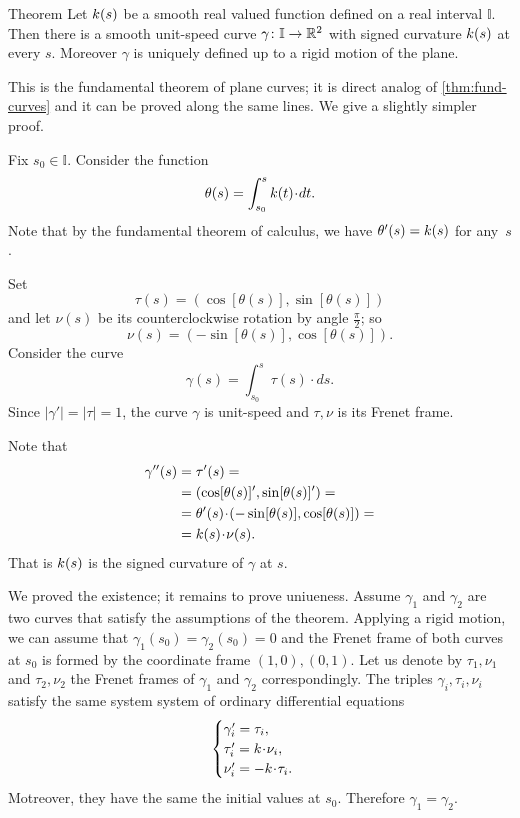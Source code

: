 \begin{thm}{Theorem}\label{thm:fund-curves-2D}
Let $k(s)$ be a smooth real valued function defined on a real interval $\mathbb{I}$.
Then there is a smooth unit-speed curve $\gamma\colon\mathbb{I}\to\mathbb{R}^2$ with signed curvature $k(s)$ at every $s$.
Moreover $\gamma$ is uniquely defined up to a rigid motion of the plane.
\end{thm}

This is the fundamental theorem of plane curves; it is direct analog of \ref{thm:fund-curves} and it can be proved along the same lines.
We give a slightly simpler proof.

Fix $s_0\in\mathbb{I}$.
Consider the function
\[\theta(s)=\int_{s_0}^s\skur(t)\cdot dt.\]
Note that by the fundamental theorem of calculus, we have $\theta'(s)\z=\skur(s)$ for any~$s$.

Set 
\[\tau(s)=(\cos[\theta(s)],\sin[\theta(s)])\] and let $\nu(s)$ be its counterclockwise rotation by angle $\tfrac\pi2$; so 
\[\nu(s)=(-\sin[\theta(s)],\cos[\theta(s)]).\]
Consider the curve 
\[\gamma(s)=\int_{s_0}^s\tau(s)\cdot ds.\]
Since $|\gamma'|=|\tau|=1$, the curve $\gamma$ is unit-speed and $\tau,\nu$ is its Frenet frame. 

Note that
\begin{align*}
\gamma''(s)&=\tau'(s)=
\\
&=(\cos[\theta(s)]',\sin[\theta(s)]')=
\\
&=\theta'(s)\cdot (-\sin[\theta(s)],\cos[\theta(s)])=
\\
&=\skur(s)\cdot \nu(s).
\end{align*}
That is $k(s)$ is the signed curvature of $\gamma$ at $s$.

We proved the existence; it remains to prove uniueness.
Assume $\gamma_1$ and $\gamma_2$ are two curves that satisfy the assumptions of the theorem.
Applying a rigid motion, we can assume that $\gamma_1(s_0)=\gamma_2(s_0)=0$ and the Frenet frame of both curves at $s_0$ is formed by the coordinate frame $(1,0),(0,1)$.
Let us denote by $\tau_1,\nu_1$ and $\tau_2,\nu_2$ the Frenet frames of $\gamma_1$ and $\gamma_2$ correspondingly. The triples $\gamma_i,\tau_i,\nu_i$ satisfy the same system system of ordinary differential equations 
\[
\begin{cases}
\gamma_i'=\tau_i,
\\
\tau_i'=\kur\cdot\nu_i,
\\
\nu_i'=-\kur\cdot\tau_i.
\end{cases}
\]
Motreover, they have the same the initial values at $s_0$.
Therefore $\gamma_1=\gamma_2$.
\qeds

